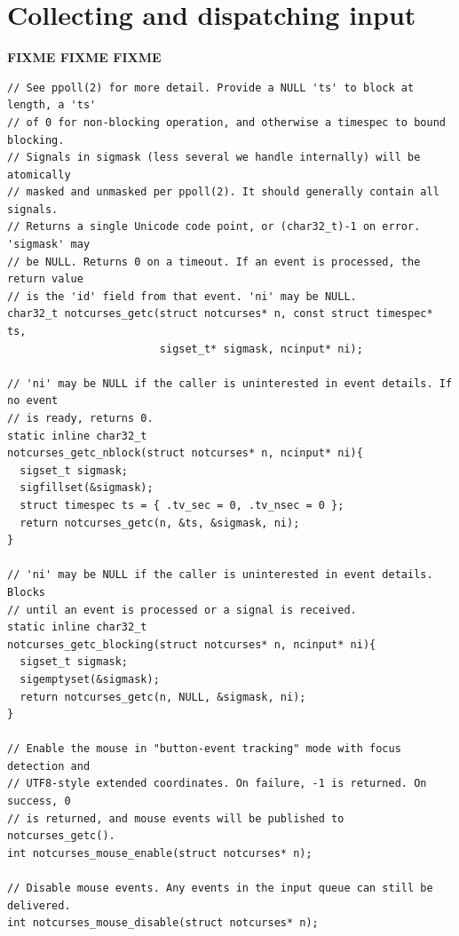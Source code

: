 \documentclass[letterpaper,10pt]{article}
\begin{document}
\newpage

\section{Collecting and dispatching input}
\label{sec:input}

\textbf{FIXME FIXME FIXME}

\begin{listing}[!htbp]
\begin{verbatim}
// See ppoll(2) for more detail. Provide a NULL 'ts' to block at length, a 'ts'
// of 0 for non-blocking operation, and otherwise a timespec to bound blocking.
// Signals in sigmask (less several we handle internally) will be atomically
// masked and unmasked per ppoll(2). It should generally contain all signals.
// Returns a single Unicode code point, or (char32_t)-1 on error. 'sigmask' may
// be NULL. Returns 0 on a timeout. If an event is processed, the return value
// is the 'id' field from that event. 'ni' may be NULL.
char32_t notcurses_getc(struct notcurses* n, const struct timespec* ts,
                        sigset_t* sigmask, ncinput* ni);

// 'ni' may be NULL if the caller is uninterested in event details. If no event
// is ready, returns 0.
static inline char32_t
notcurses_getc_nblock(struct notcurses* n, ncinput* ni){
  sigset_t sigmask;
  sigfillset(&sigmask);
  struct timespec ts = { .tv_sec = 0, .tv_nsec = 0 };
  return notcurses_getc(n, &ts, &sigmask, ni);
}

// 'ni' may be NULL if the caller is uninterested in event details. Blocks
// until an event is processed or a signal is received.
static inline char32_t
notcurses_getc_blocking(struct notcurses* n, ncinput* ni){
  sigset_t sigmask;
  sigemptyset(&sigmask);
  return notcurses_getc(n, NULL, &sigmask, ni);
}

// Enable the mouse in "button-event tracking" mode with focus detection and
// UTF8-style extended coordinates. On failure, -1 is returned. On success, 0
// is returned, and mouse events will be published to notcurses_getc().
int notcurses_mouse_enable(struct notcurses* n);

// Disable mouse events. Any events in the input queue can still be delivered.
int notcurses_mouse_disable(struct notcurses* n);
\end{verbatim}
\end{listing}

\newpage
\end{document}
